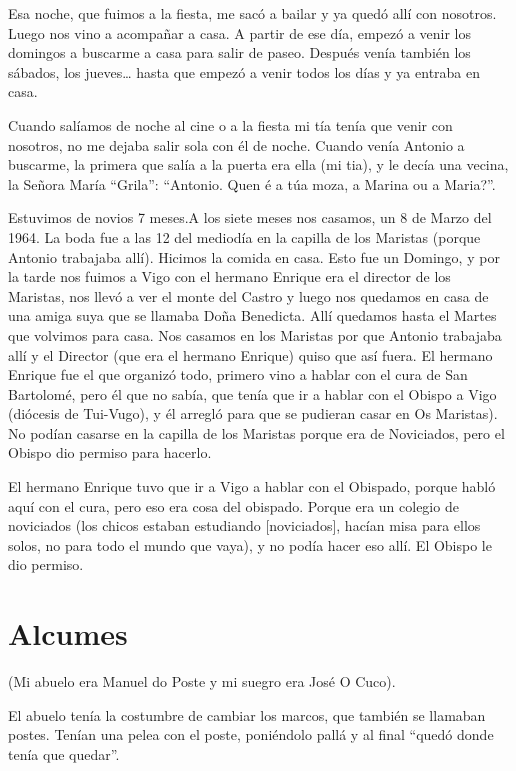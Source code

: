 \documentclass[12pt,a5paper]{book}
\begin{document}
Esa noche, que fuimos a la fiesta, me sacó a bailar y ya quedó allí con nosotros. Luego nos vino a acompañar a casa. A partir de ese día, empezó a venir los domingos a buscarme a casa para salir de paseo. Después venía también los sábados, los jueves… hasta que empezó a venir todos los días y ya entraba en casa.

Cuando salíamos de noche al cine o a la fiesta mi tía tenía que venir con nosotros, no me dejaba salir sola con él de noche. Cuando venía Antonio a buscarme, la primera que salía a la puerta era ella (mi tia), y le decía una vecina, la Señora María “Grila”: “Antonio. Quen é a túa moza, a Marina ou a Maria?”.

Estuvimos de novios 7 meses.A los siete meses nos casamos, un 8 de Marzo del 1964. La boda fue a las 12 del mediodía en la capilla de los Maristas (porque Antonio trabajaba allí). Hicimos la comida en casa. Esto fue un Domingo, y por la tarde nos fuimos a Vigo con el hermano Enrique era el director de los Maristas, nos llevó a ver el monte del Castro y luego nos quedamos en casa de una amiga suya que se llamaba Doña Benedicta. Allí quedamos hasta el Martes que volvimos para casa. Nos casamos en los Maristas por que Antonio trabajaba allí y el Director (que era el hermano Enrique) quiso que así fuera. El hermano Enrique fue el que organizó todo, primero vino a hablar con el cura de San Bartolomé, pero él que no sabía, que tenía que ir a hablar con el Obispo a Vigo (diócesis de Tui-Vugo), y él arregló para que se pudieran casar en Os Maristas). No podían casarse en la capilla de los Maristas porque era de Noviciados, pero el Obispo dio permiso para hacerlo.

El hermano Enrique tuvo que ir a Vigo a hablar con el Obispado, porque habló aquí con el cura, pero eso era cosa del obispado. Porque era un colegio de noviciados (los chicos estaban estudiando [noviciados], hacían misa para ellos solos, no para todo el mundo que vaya), y no podía hacer eso allí. El Obispo le dio permiso.


\section*{Alcumes}

(Mi abuelo era Manuel do Poste y mi suegro era José O Cuco).

El abuelo tenía la costumbre de cambiar los marcos, que también se llamaban postes. Tenían una pelea con el poste, poniéndolo pallá y al final “quedó donde tenía que quedar”.
\end{document}
